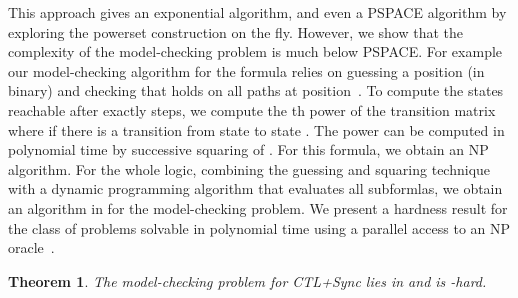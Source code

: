 \documentclass{article}
\newtheorem{theorem}{Theorem}
\begin{document}
This approach gives an exponential algorithm, and even a PSPACE algorithm 
by exploring the powerset construction on the fly. 
However, we show that the complexity of the model-checking problem is much below PSPACE. 
For example our model-checking algorithm for the formula 
relies on guessing a position  (in binary) and checking that  holds on all paths at position~. 
To compute the states reachable after exactly  steps, we compute the th
power of the transition matrix  where 
if there is a transition from state  to state . The power  can be computed 
in polynomial time by successive squaring of . For this formula, we obtain
an NP algorithm. For the whole logic, combining the guessing and squaring technique
with a dynamic programming algorithm that evaluates all subformlas, 
we obtain an algorithm in  for the model-checking problem.
We present a hardness result for the class  of
problems solvable in polynomial time using a parallel access to an NP oracle~\cite{Wagner87,Spako05}.


\begin{theorem}\label{theo:CTL+Sync-complexity}
The model-checking problem for CTL+Sync lies in  and is -hard.
\end{theorem}
\end{document}
